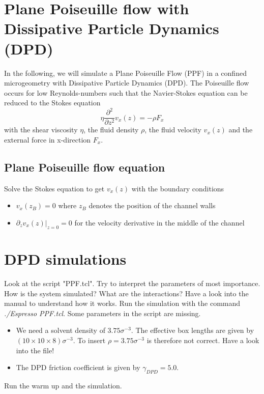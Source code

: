 \documentclass[11pt,a4paper,%
	       headsepline=false, footsepline=false, notitlepage, %
	       bigheadings, %
	       bibtotoc, %
	       final]{scrartcl}
\begin{document}
\section*{Plane Poiseuille flow with Dissipative Particle Dynamics (DPD)}
In the following, we will simulate a Plane Poiseuille Flow (PPF) in a confined microgeometry with Dissipative Particle Dynamics (DPD).
The Poiseuille flow occurs for low Reynolds-numbers such that the Navier-Stokes equation can be reduced to the Stokes equation
\begin{equation}
\eta\frac{\partial^2}{\partial z^2}v_x(z) = -\rho F_x
\end{equation}
with the shear viscosity $\eta$, the fluid density $\rho$, the fluid velocity $v_x(z)$ and the external force in x-direction $F_x$.
\subsection*{Plane Poiseuille flow equation}
Solve the Stokes equation to get $v_x(z)$ with the boundary conditions
\begin{itemize}
\item $v_x(z_B) = 0$ where $z_B$ denotes the position of the channel walls
\item $\partial_zv_x(z)|_{z=0} = 0$ for the velocity derivative in the middle of the channel
\end{itemize}
\section*{DPD simulations}
Look at the script "PPF.tcl". Try to interpret the parameters of most importance.
How is the system simulated? What are the interactions? Have a look into the manual to understand how it works.
Run the simulation with the command {\em ./Espresso PPF.tcl}.
Some parameters in the script are missing.
\begin{itemize}
\item We need a solvent density of $3.75 \sigma^{-3}$. The effective box lengths are given by $(10\times 10\times 8)\sigma^{-3}$. To insert $\rho=3.75 \sigma^{-3}$ is therefore not correct. Have a look into the file!
\item The DPD friction coefficient is given by $\gamma_{DPD}=5.0$.
\end{itemize}
Run the warm up and the simulation.
\end{document}
